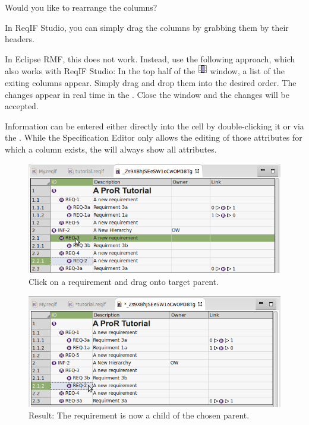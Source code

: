\begin{info}
Would you like to rearrange the columns?

In ReqIF Studio, you can simply drag the columns by grabbing them by their headers.

In Eclipse RMF, this does not work. Instead, use the following approach, which also works with ReqIF Studio:
In the top half of the  {\includegraphics[scale=0.6]{../rmf-images/icons/full/obj16/Column.png}} window, a list of the exiting columns appear. Simply drag and drop them into the desired order. The changes appear in real time in the . Close the window and the changes will be accepted.
\end{info}

Information can be entered either directly into the cell by double-clicking it or via the .  While the Specification Editor only allows the editing of those attributes for which a column exists, the  will always show all attributes.

\begin{figure}
  \centering
  \includegraphics[width=0.8\linewidth]{../rmf-images/hierarchy_step_1.png}
  \caption{Click on a requirement and drag onto target parent.}
  \label{fig:hierarchy_step_1}
\end{figure}
\begin{figure}
  \centering
  \includegraphics[width=0.8\linewidth]{../rmf-images/hierarchy_step_2.png}
  \caption{Result: The requirement is now a child of the chosen parent.}
  \label{fig:hierarchy_step_2}
\end{figure}


